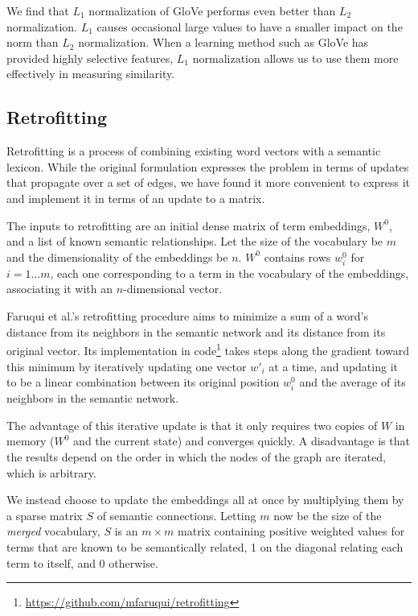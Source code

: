 \documentclass[11pt,letterpaper]{article}
\begin{document}
We find that $L_1$ normalization of GloVe performs even better than $L_2$
normalization. $L_1$ causes occasional large values to have a smaller impact on the norm
than $L_2$ normalization. When a learning method such as GloVe has provided
highly selective features, $L_1$ normalization allows us to use them more effectively
in measuring similarity.


\subsection{Retrofitting}

Retrofitting \cite{faruqui2015retrofitting} is a process of combining existing
word vectors with a semantic lexicon. While the original formulation expresses
the problem in terms of updates that propagate over a set of edges, we have
found it more convenient to express it and implement it in terms of an update
to a matrix.

The inputs to retrofitting are an initial dense matrix of term embeddings,
$W^0$, and a list of known semantic relationships. Let the size
of the vocabulary be $m$ and the dimensionality of the embeddings be $n$.
$W^0$ contains rows $w^0_i$ for $i = 1 \ldots m$, each one corresponding to
a term in the vocabulary of the embeddings, associating it with an
$n$-dimensional vector.

Faruqui et al.'s retrofitting procedure aims to minimize a sum of
a word's distance from its neighbors in the semantic network and its distance
from its original vector. Its implementation in code\footnote{
    \url{https://github.com/mfaruqui/retrofitting}
} takes steps along the gradient toward this minimum
by iteratively updating one vector $w'_i$ at a time, and updating it to be a linear
combination between its original position $w^0_i$ and the average of its neighbors
in the semantic network.

The advantage of this iterative update is that it only requires two copies of
$W$ in memory ($W^0$ and the current state) and converges quickly. A disadvantage
is that the results depend on the order in which the nodes of the graph are
iterated, which is arbitrary.

We instead choose to update the embeddings all at once by multiplying them by a
sparse matrix $S$ of semantic connections. Letting $m$ now be the size of the
{\em merged} vocabulary, $S$ is an $m \times m$ matrix containing positive
weighted values for terms that are known to be semantically related, 1 on the
diagonal relating each term to itself, and 0 otherwise.
\end{document}
